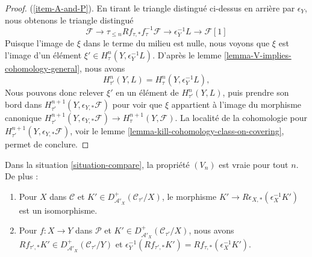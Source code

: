 \begin{proof}
(\ref{item-A-and-P}). En tirant le triangle distingué ci-dessus en arrière
par $\epsilon_Y$, nous obtenons le triangle distingué
$$
\mathcal{F} \to \tau_{\leq n}Rf_{\tau, *}f_\tau^{-1}\mathcal{F}
\to \epsilon_Y^{-1}L \to \mathcal{F}[1]
$$
Puisque l'image de $\xi$ dans le terme du milieu est nulle, nous voyons que
$\xi$ est l'image d'un élément
$\xi' \in H^n_\tau(Y, \epsilon_Y^{-1}L)$.
D'après le lemme \ref{lemma-V-implies-cohomology-general}, nous avons
$$
H^n_{\tau'}(Y, L) = H^n_\tau(Y, \epsilon_Y^{-1}L),
$$
Nous pouvons donc relever $\xi'$ en un élément de $H^n_{\tau'}(Y, L)$,
puis prendre son bord dans
$H^{n + 1}_{\tau'}(Y, \epsilon_{Y, *}\mathcal{F})$
pour voir que $\xi$ appartient à l'image du morphisme canonique
$H^{n + 1}_{\tau'}(Y, \epsilon_{Y, *}\mathcal{F}) \to
H^{n + 1}_\tau(Y, \mathcal{F})$.
La localité de la cohomologie pour
$H^{n + 1}_{\tau'}(Y,\epsilon_{Y, *}\mathcal{F})$, voir le
lemme \ref{lemma-kill-cohomology-class-on-covering}, permet de conclure.
\end{proof}

\begin{lemma}
\label{lemma-V-C-all-n-general}
Dans la situation \ref{situation-compare}, la propriété $(V_n)$ est vraie
pour tout $n$. De plus :
\begin{enumerate}
\item Pour $X$ dans $\mathcal{C}$ et
$K' \in D^+_{\mathcal{A}'_X}(\mathcal{C}_{\tau'}/X)$, le morphisme
$K' \to R\epsilon_{X, *}(\epsilon_X^{-1}K')$ est un isomorphisme.
\item Pour $f : X \to Y$ dans $\mathcal{P}$ et
$K' \in D^+_{\mathcal{A}'_X}(\mathcal{C}_{\tau'}/X)$, nous avons
$Rf_{\tau', *}K' \in D^+_{\mathcal{A}'_X}(\mathcal{C}_{\tau'}/Y)$ et
$\epsilon_Y^{-1}(Rf_{\tau', *}K') = Rf_{\tau, *}(\epsilon_X^{-1}K')$.
\end{enumerate}
\end{lemma}

